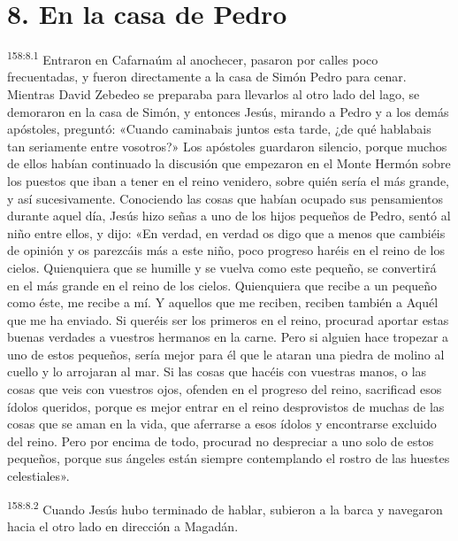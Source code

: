\section*{8. En la casa de Pedro}
\par 
\textsuperscript{158:8.1} Entraron en Cafarnaúm al anochecer, pasaron por calles poco frecuentadas, y fueron directamente a la casa de Simón Pedro para cenar. Mientras David Zebedeo se preparaba para llevarlos al otro lado del lago, se demoraron en la casa de Simón, y entonces Jesús, mirando a Pedro y a los demás apóstoles, preguntó: «Cuando caminabais juntos esta tarde, ¿de qué hablabais tan seriamente entre vosotros?» Los apóstoles guardaron silencio, porque muchos de ellos habían continuado la discusión que empezaron en el Monte Hermón sobre los puestos que iban a tener en el reino venidero, sobre quién sería el más grande, y así sucesivamente. Conociendo las cosas que habían ocupado sus pensamientos durante aquel día, Jesús hizo señas a uno de los hijos pequeños de Pedro, sentó al niño entre ellos, y dijo: «En verdad, en verdad os digo que a menos que cambiéis de opinión y os parezcáis más a este niño, poco progreso haréis en el reino de los cielos. Quienquiera que se humille y se vuelva como este pequeño, se convertirá en el más grande en el reino de los cielos. Quienquiera que recibe a un pequeño como éste, me recibe a mí. Y aquellos que me reciben, reciben también a Aquél que me ha enviado. Si queréis ser los primeros en el reino, procurad aportar estas buenas verdades a vuestros hermanos en la carne. Pero si alguien hace tropezar a uno de estos pequeños, sería mejor para él que le ataran una piedra de molino al cuello y lo arrojaran al mar. Si las cosas que hacéis con vuestras manos, o las cosas que veis con vuestros ojos, ofenden en el progreso del reino, sacrificad esos ídolos queridos, porque es mejor entrar en el reino desprovistos de muchas de las cosas que se aman en la vida, que aferrarse a esos ídolos y encontrarse excluido del reino. Pero por encima de todo, procurad no despreciar a uno solo de estos pequeños, porque sus ángeles están siempre contemplando el rostro de las huestes celestiales».

\par 
\textsuperscript{158:8.2} Cuando Jesús hubo terminado de hablar, subieron a la barca y navegaron hacia el otro lado en dirección a Magadán.